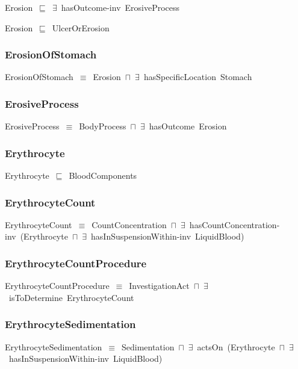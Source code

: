 \documentclass{article}
\begin{document}
Erosion~\ensuremath{\sqsubseteq}~\ensuremath{\exists}~hasOutcome-inv~ErosiveProcess~

Erosion~\ensuremath{\sqsubseteq}~UlcerOrErosion~

\subsubsection*{ErosionOfStomach}

ErosionOfStomach~\ensuremath{\equiv}~Erosion~\ensuremath{\sqcap}~\ensuremath{\exists}~hasSpecificLocation~Stomach

\subsubsection*{ErosiveProcess}

ErosiveProcess~\ensuremath{\equiv}~BodyProcess~\ensuremath{\sqcap}~\ensuremath{\exists}~hasOutcome~Erosion

\subsubsection*{Erythrocyte}

Erythrocyte~\ensuremath{\sqsubseteq}~BloodComponents~

\subsubsection*{ErythrocyteCount}

ErythrocyteCount~\ensuremath{\equiv}~CountConcentration~\ensuremath{\sqcap}~\ensuremath{\exists}~hasCountConcentration-inv~(Erythrocyte~\ensuremath{\sqcap}~\ensuremath{\exists}~hasInSuspensionWithin-inv~LiquidBlood)

\subsubsection*{ErythrocyteCountProcedure}

ErythrocyteCountProcedure~\ensuremath{\equiv}~InvestigationAct~\ensuremath{\sqcap}~\ensuremath{\exists}~isToDetermine~ErythrocyteCount

\subsubsection*{ErythrocyteSedimentation}

ErythrocyteSedimentation~\ensuremath{\equiv}~Sedimentation~\ensuremath{\sqcap}~\ensuremath{\exists}~actsOn~(Erythrocyte~\ensuremath{\sqcap}~\ensuremath{\exists}~hasInSuspensionWithin-inv~LiquidBlood)
\end{document}
